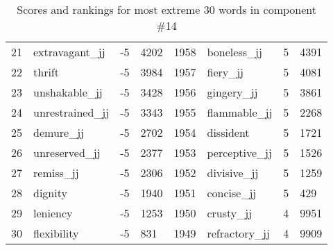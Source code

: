 \begin{table}[tbp]
\begin{tabular}{| rlr@{.}l | rlr@{.}l |}
    21 & extravagant\_jj & -5 & 4202    &    1958 & boneless\_jj & 5 & 4391 \\
    22 & thrift & -5 & 3984    &    1957 & fiery\_jj & 5 & 4081 \\
    23 & unshakable\_jj & -5 & 3428    &    1956 & gingery\_jj & 5 & 3861 \\
    24 & unrestrained\_jj & -5 & 3343    &    1955 & flammable\_jj & 5 & 2268 \\
    25 & demure\_jj & -5 & 2702    &    1954 & dissident & 5 & 1721 \\
    26 & unreserved\_jj & -5 & 2377    &    1953 & perceptive\_jj & 5 & 1526 \\
    27 & remiss\_jj & -5 & 2306    &    1952 & divisive\_jj & 5 & 1259 \\
    28 & dignity & -5 & 1940    &    1951 & concise\_jj & 5 & 429 \\
    29 & leniency & -5 & 1253    &    1950 & crusty\_jj & 4 & 9951 \\
    30 & flexibility & -5 & 831    &    1949 & refractory\_jj & 4 & 9909 \\
    \hline
    \end{tabular}
    \caption{Scores and rankings for most extreme 30 words in component \#14} 
\end{table}
\clearpage
